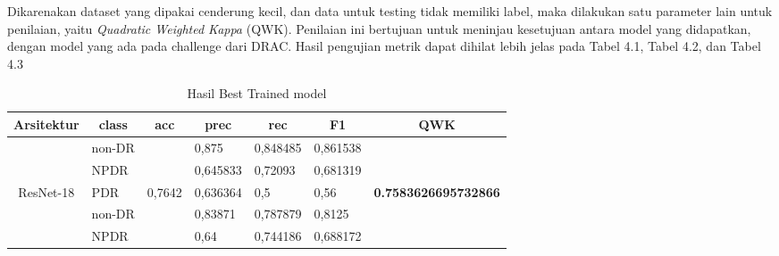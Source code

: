 Dikarenakan dataset yang dipakai cenderung kecil, dan data untuk testing tidak memiliki label, maka dilakukan satu parameter lain untuk penilaian, yaitu \emph{Quadratic Weighted Kappa} (QWK). Penilaian ini bertujuan untuk meninjau kesetujuan antara model yang didapatkan, dengan model yang ada pada challenge dari DRAC. Hasil pengujian metrik dapat dihilat lebih jelas pada Tabel 4.1, Tabel 4.2, dan Tabel 4.3

\pagebreak

\begin{table}[hbtp]
	\begin{center}
		\caption{Hasil Best Trained model}
		\label{tb:HasilTrainDefault}
		\begin{tabular}{|c|l|c|l|l|l|c|}
			\hline
			\rowcolor[HTML]{C0C0C0} 
			Arsitektur & \multicolumn{1}{c|}{\cellcolor[HTML]{C0C0C0}class} & acc                      & \multicolumn{1}{c|}{\cellcolor[HTML]{C0C0C0}prec} & \multicolumn{1}{c|}{\cellcolor[HTML]{C0C0C0}rec} & \multicolumn{1}{c|}{\cellcolor[HTML]{C0C0C0}F1} & QWK                                  \\ \hline
			& non-DR                                             &                          & 0,875                                             & 0,848485                                         & 0,861538                                        &                                      \\ \cline{2-2} \cline{4-6}
			& NPDR                                               &                          & 0,645833                                          & 0,72093                                          & 0,681319                                        &                                      \\ \cline{2-2} \cline{4-6}
			\multirow{-3}{*}{ResNet-18}  & PDR                                                & \multirow{-3}{*}{0,7642} & 0,636364                                          & 0,5                                              & 0,56                                            & \multirow{-3}{*}{\textbf{0.7583626695732866}} \\ \hline
			& non-DR                                             &                          & 0,83871                                           & 0,787879                                         & 0,8125                                          &                                      \\ \cline{2-2} \cline{4-6}
			& NPDR                                               &                          & 0,64                                              & 0,744186                                         & 0,688172                                        &                                      \\ \cline{2-2} \cline{4-6}

\end{tabular}
\end{center}
\end{table}
